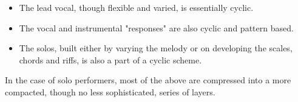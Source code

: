 \documentclass{article}
\begin{document}
\begin{itemize}
    \item The lead vocal, though flexible and varied, is essentially cyclic.
    \item The vocal and instrumental "responses" are also cyclic and pattern based.
    \item The solos, built either by varying the melody or on developing the scales, chords and riffs, is also a part of a cyclic scheme.
\end{itemize}

In the case of solo performers, most of the above are compressed into a more compacted, though no less sophisticated, series of layers.
\end{document}
